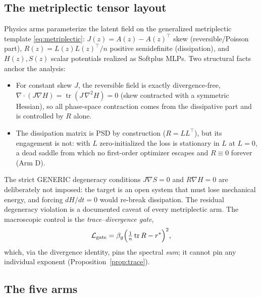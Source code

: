 \documentclass[journal]{IEEEtran}
\newcommand{\tr}{\operatorname{tr}}
\newcommand{\grad}{\nabla}
\begin{document}
\subsection{The metriplectic tensor layout}
\label{sec:methods-metriplectic}

Physics arms parameterize the latent field on the generalized
metriplectic template \eqref{eq:metriplectic}: $J(z)=A(z)-A(z)^\top$
skew (reversible/Poisson part), $R(z)=L(z)L(z)^\top/n$ positive
semidefinite (dissipation), and $H(z),S(z)$ scalar potentials realized as
Softplus MLPs. Two structural facts anchor the analysis:
\begin{itemize}
\item For constant skew $J$, the reversible field is exactly
divergence-free, $\grad\!\cdot(J\grad H)=\tr(J\,\grad^2H)=0$ (skew
contracted with a symmetric Hessian), so all phase-space contraction
comes from the dissipative part and is controlled by $R$ alone.
\item The dissipation matrix is PSD by construction ($R=LL^\top$), but
its engagement is not: with $L$ zero-initialized the loss is stationary
in $L$ at $L=0$, a dead saddle from which no first-order optimizer
escapes and $R\equiv0$ forever (Arm D).
\end{itemize}
The strict GENERIC degeneracy conditions $J\grad S=0$ and $R\grad H=0$
\cite{grmela1997dynamics,ottinger1997dynamics} are deliberately not
imposed: the target is an open system that must lose mechanical energy,
and forcing $dH/dt=0$ would re-break dissipation. The residual
degeneracy violation is a documented caveat of every metriplectic arm.
The macroscopic control is the \emph{trace--divergence gate},
\begin{equation}
  \mathcal L_{\rm gate}=\beta_g\Big(\tfrac1n\tr R - r^\ast\Big)^2,
\end{equation}
which, via the divergence identity, pins the spectral \emph{sum}; it
cannot pin any individual exponent (Proposition~\ref{prop:trace}).

\subsection{The five arms}
\label{sec:methods-arms}
\end{document}
